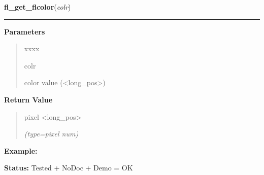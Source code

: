 \hspace{.8\funcindent}\begin{boxedminipage}{\funcwidth}

    \raggedright \textbf{fl\_get\_flcolor}(\textit{colr})

    \vspace{-1.5ex}

    \rule{\textwidth}{0.5\fboxrule}
\setlength{\parskip}{2ex}
\setlength{\parskip}{1ex}
      \textbf{Parameters}
      \vspace{-1ex}

      \begin{quote}
        \begin{Ventry}{xxxx}

          \item[colr]

          color value ({\textless}long\_pos{\textgreater})

        \end{Ventry}

      \end{quote}

      \textbf{Return Value}
    \vspace{-1ex}

      \begin{quote}
      pixel {\textless}long\_pos{\textgreater}

      {\it (type=pixel num)}

      \end{quote}

\textbf{Example:} 

\textbf{Status:} Tested + NoDoc + Demo = OK



    \end{boxedminipage}

    \label{xformslib:library:fl_get_icm_color}

    \vspace{0.5ex}

